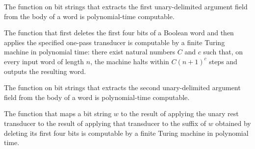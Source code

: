 \begin{theorem}
\label{Randomized.PIT.polyTimeComputable_arg1W}
\leanok
{}
The function on bit strings that extracts the first unary-delimited argument field from
the body of a word is polynomial-time computable.
\end{theorem}

\begin{theorem}
\label{Randomized.PIT.polyTimeComputable_midW}
\leanok
{}
The function that first deletes the first four bits of a Boolean word and then applies
the specified one-pass transducer is computable by a finite Turing machine in polynomial
time: there exist natural numbers $C$ and $c$ such that, on every input word of length
$n$, the machine halts within $C(n+1)^c$ steps and outputs the resulting word.
\end{theorem}

\begin{theorem}
\label{Randomized.PIT.polyTimeComputable_arg2W}
\leanok
{}
The function on bit strings that extracts the second unary-delimited argument field from
the body of a word is polynomial-time computable.
\end{theorem}

\begin{theorem}
\label{Randomized.PIT.polyTimeComputable_rest2W}
\leanok
{}
The function that maps a bit string $w$ to the result of applying the unary rest
transducer to the result of applying that transducer to the suffix of $w$ obtained by
deleting its first four bits is computable by a finite Turing machine in polynomial
time.
\end{theorem}

